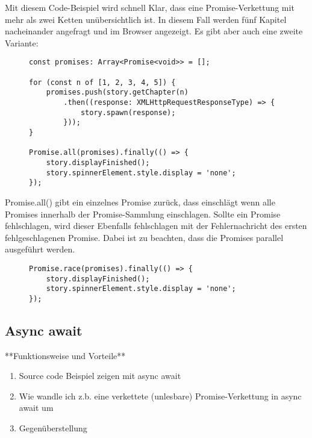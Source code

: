 \noindent
Mit diesem Code-Beispiel wird schnell Klar, dass eine Promise-Verkettung mit mehr als zwei Ketten unübersichtlich ist. In diesem Fall  werden fünf Kapitel nacheinander angefragt und im Browser angezeigt. Es gibt aber auch eine zweite Variante: 

\begin{figure}[H]
\begin{lstlisting}
const promises: Array<Promise<void>> = [];

for (const n of [1, 2, 3, 4, 5]) {
    promises.push(story.getChapter(n)
        .then((response: XMLHttpRequestResponseType) => {
            story.spawn(response);
        }));
}

Promise.all(promises).finally(() => {
    story.displayFinished();
    story.spinnerElement.style.display = 'none';
});
\end{lstlisting}
\end{figure}

Promise.all() gibt ein einzelnes Promise zurück, dass einschlägt wenn alle Promises innerhalb der Promise-Sammlung einschlagen. Sollte ein Promise fehlschlagen, wird dieser Ebenfalls fehlschlagen mit der Fehlernachricht des ersten fehlgeschlagenen Promise.\cite{promise-executor} Dabei ist zu beachten, dass die Promises parallel ausgeführt werden.

\begin{figure}[H]
\begin{lstlisting}
Promise.race(promises).finally(() => {
    story.displayFinished();
    story.spinnerElement.style.display = 'none';
});
\end{lstlisting}
\end{figure}

\subsection{Async await}
**Funktionsweise und Vorteile**

\begin{enumerate} 
\item Source code Beispiel zeigen mit async await
\item Wie wandle ich z.b. eine verkettete (unlesbare) Promise-Verkettung in async await um 
\item Gegenüberstellung
\end{enumerate}


